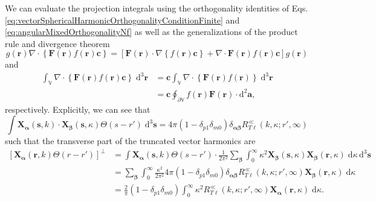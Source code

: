 We can evaluate the projection integrals using the orthogonality identities of Eqs. \eqref{eq:vectorSphericalHarmonicOrthogonalityConditionFinite} and \eqref{eq:angularMixedOrthogonalityNf} as well as the generalizations of the product rule and divergence theorem
\begin{equation}\label{eq:generalizedProductRule}
g(\mathbf{r})\nabla\cdot\left\{\mathbf{F}(\mathbf{r})f(\mathbf{r})\mathbf{c}\right\} = \left[\mathbf{F}(\mathbf{r})\cdot\nabla \left\{f(\mathbf{r})\mathbf{c}\right\} + \nabla\cdot\mathbf{F}(\mathbf{r})f(\mathbf{r})\mathbf{c}\right]g(\mathbf{r})
\end{equation}
and
\begin{equation}\label{eq:generalizedDivergenceTheorem}
\begin{split}
\int_\mathbb{V}\nabla\cdot\left\{\mathbf{F}(\mathbf{r})f(\mathbf{r})\mathbf{c}\right\}\;\mathrm{d}^3\mathbf{r} &= \mathbf{c}\int_\mathbb{V}\nabla\cdot\left\{\mathbf{F}(\mathbf{r})f(\mathbf{r})\right\}\;\mathrm{d}^3\mathbf{r}\\
&= \mathbf{c}\oint_{\partial\mathbb{V}} f(\mathbf{r})\mathbf{F}(\mathbf{r})\cdot\mathrm{d}^2\mathbf{a},
\end{split}
\end{equation} 
respectively. Explicitly, we can see that
\begin{equation}
\int\mathbf{X}_{\bm{\alpha}}(\mathbf{s},k)\cdot\mathbf{X}_{\bm{\beta}}(\mathbf{s},\kappa)\Theta(s - r')\;\mathrm{d}^3\mathbf{s} = 4\pi(1 - \delta_{p1}\delta_{m0})\delta_{\bm{\alpha}\bm{\beta}}R^\ll_{T\ell}(k,\kappa;r',\infty)
\end{equation}
such that the transverse part of the truncated vector harmonics are
\begin{equation}
\begin{split}
\left[\mathbf{X}_{\bm{\alpha}}(\mathbf{r},k)\Theta(r - r')\right]^\perp &= \int\mathbf{X}_{\bm{\alpha}}(\mathbf{s},k)\Theta(s - r')\cdot\frac{1}{2\pi^2}\sum_{\bm{\beta}}\int_0^\infty\kappa^2\mathbf{X}_{\bm{\beta}}(\mathbf{s},\kappa)\mathbf{X}_{\bm{\beta}}(\mathbf{r},\kappa)\;\mathrm{d}\kappa\,\mathrm{d}^3\mathbf{s}\\
&= \sum_{\bm{\beta}}\int_0^\infty \frac{\kappa^2}{2\pi^2}4\pi(1 - \delta_{p1}\delta_{m0})\delta_{\bm{\alpha}\bm{\beta}}R_{T\ell}^\ll(k,\kappa;r',\infty)\mathbf{X}_{\bm{\beta}}(\mathbf{r},\kappa)\;\mathrm{d}\kappa\\
&= \frac{2}{\pi}(1 - \delta_{p1}\delta_{m0})\int_0^\infty \kappa^2R_{T\ell}^\ll(k,\kappa;r',\infty)\mathbf{X}_{\bm{\alpha}}(\mathbf{r},\kappa)\;\mathrm{d}\kappa.
\end{split}
\end{equation}



